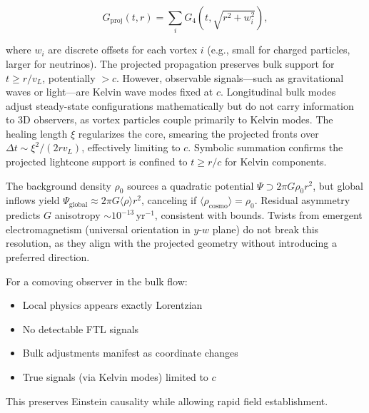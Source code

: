 \begin{equation}
G_{\text{proj}}(t, r) = \sum_i G_4(t, \sqrt{r^2 + w_i^2}),
\end{equation}

where $w_i$ are discrete offsets for each vortex $i$ (e.g., small for charged particles, larger for neutrinos). The projected propagation preserves bulk support for $t \geq r / v_L$, potentially $>c$. However, observable signals---such as gravitational waves or light---are Kelvin wave modes fixed at $c$. Longitudinal bulk modes adjust steady-state configurations mathematically but do not carry information to 3D observers, as vortex particles couple primarily to Kelvin modes. The healing length $\xi$ regularizes the core, smearing the projected fronts over $\Delta t \sim \xi^2 / (2 r v_L)$, effectively limiting to $c$. Symbolic summation confirms the projected lightcone support is confined to $t \geq r / c$ for Kelvin components.

The background density $\rho_0$ sources a quadratic potential $\Psi \supset 2\pi G \rho_0 r^2$, but global inflows yield $\Psi_{\text{global}} \approx 2\pi G \langle \rho \rangle r^2$, canceling if $\langle \rho_{\text{cosmo}} \rangle = \rho_0$. Residual asymmetry predicts $G$ anisotropy $\sim 10^{-13} \,\mathrm{yr}^{-1}$, consistent with bounds. Twists from emergent electromagnetism (universal orientation in $y$-$w$ plane) do not break this resolution, as they align with the projected geometry without introducing a preferred direction.

For a comoving observer in the bulk flow:
\begin{itemize}
\item Local physics appears exactly Lorentzian
\item No detectable FTL signals
\item Bulk adjustments manifest as coordinate changes
\item True signals (via Kelvin modes) limited to $c$
\end{itemize}

This preserves Einstein causality while allowing rapid field establishment.

\medskip
\noindent
{}
\medskip

